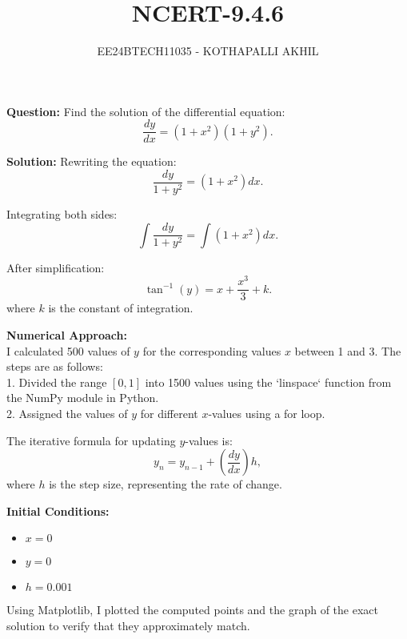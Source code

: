 \documentclass[article]{IEEEtran}
\numberwithin{figure}{enumi}
\begin{document}

\title{NCERT-9.4.6}
\author{EE24BTECH11035 - KOTHAPALLI AKHIL}
{\let\newpage\relax\maketitle}

\noindent\textbf{Question: }  
Find the solution of the differential equation:  
\begin{equation*}
    \frac{dy}{dx} = (1 + x^2)(1 + y^2).
\end{equation*}

\noindent\textbf{Solution:}  
Rewriting the equation:  
\begin{equation*}
    \frac{dy}{1 + y^2} = (1 + x^2) dx.
\end{equation*}

\noindent Integrating both sides:  
\begin{equation*}
    \int \frac{dy}{1 + y^2} = \int (1 + x^2) dx.
\end{equation*}

\noindent After simplification:  
\begin{equation*}
    \tan^{-1}(y) = x + \frac{x^3}{3} + k.
\end{equation*}
where \(k\) is the constant of integration.

\vspace{0.5em}

\noindent\textbf{Numerical Approach:}\\ I calculated 500 values of $y$ for the corresponding values $x$ between 1 and 3. The steps are as follows:\\
1. Divided the range $[0, 1]$ into 1500 values using the `linspace` function from the NumPy module in Python. \\ 
2. Assigned the values of $y$ for different $x$-values using a for loop.  

\noindent The iterative formula for updating $y$-values is:  
\begin{equation*}
    y_n = y_{n-1} + \left(\frac{dy}{dx}\right) h,
\end{equation*}
where $h$ is the step size, representing the rate of change.  

\noindent\textbf{Initial Conditions:}  
\begin{itemize}
    \item $x = 0$  
    \item $y = 0$  
    \item $h = 0.001$  
\end{itemize}

Using Matplotlib, I plotted the computed points and the graph of the exact solution to verify that they approximately match.
\end{document}
